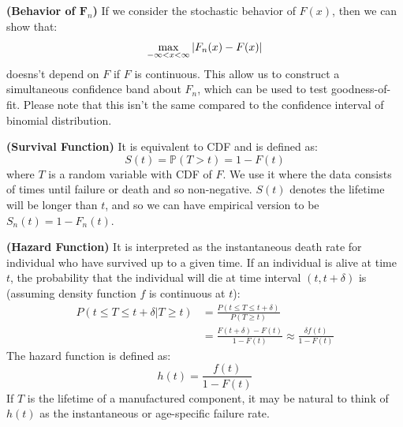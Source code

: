 \begin{remark}{\textbf{(Behavior of $\boldsymbol F_n$)}}
    If we consider the stochastic behavior of $F(x)$, then we can show that:
    \begin{equation*}
        \max_{-\infty<x<\infty} \left| F_n(x) - F(x) \right|
    \end{equation*}
    doesns't depend on $F$ if $F$ is continuous. This allow us to construct a simultaneous confidence band about $F_n$, which can be used to test goodness-of-fit. Please note that this isn't the same compared to the confidence interval of binomial distribution. 
\end{remark}

\begin{definition}{\textbf{(Survival Function)}}
    It is equivalent to CDF and is defined as:
    \begin{equation*}
        S(t) = \mathbb{P}(T > t) = 1-F(t)
    \end{equation*}
    where $T$ is a random variable with CDF of $F$. We use it where the data consists of times until failure or death and so non-negative. $S(t)$ denotes the lifetime will be longer than $t$, and so we can have empirical version to be $S_n(t) = 1-F_n(t)$. 
\end{definition}

\begin{definition}{\textbf{(Hazard Function)}}
    It is interpreted as the instantaneous death rate for individual who have survived up to a given time. If an individual is alive at time $t$, the probability that the individual will die at time interval $(t, t + \delta)$ is (assuming density function $f$ is continuous at $t$):
    \begin{equation*}
    \begin{aligned}
        P(t \le T \le t + \delta | T\ge t) &= \frac{P(t\le T \le t + \delta)}{P(T \ge t)} \\
        &= \frac{F(t + \delta) - F(t)}{1 - F(t)} \approx \frac{\delta f(t)}{1-F(t)}
    \end{aligned}
    \end{equation*}
    The hazard function is defined as:
    \begin{equation*}
        h(t) = \frac{f(t)}{1-F(t)}
    \end{equation*}
    If $T$ is the lifetime of a manufactured component, it may be natural to think of $h(t)$ as the instantaneous or age-specific failure rate. 
\end{definition}

